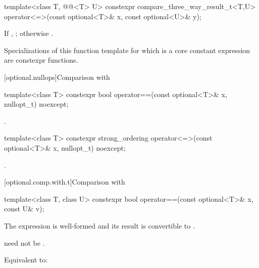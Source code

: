 %
\begin{itemdecl}
template<class T, @@<T> U>
  constexpr compare_three_way_result_t<T,U>
    operator<=>(const optional<T>& x, const optional<U>& y);
\end{itemdecl}

\begin{itemdescr}
\pnum
\returns
If , ; otherwise .

\pnum
\remarks
Specializations of this function template
for which  is a core constant expression
are constexpr functions.
\end{itemdescr}

[optional.nullops]{Comparison with }

%
\begin{itemdecl}
template<class T> constexpr bool operator==(const optional<T>& x, nullopt_t) noexcept;
\end{itemdecl}

\begin{itemdescr}
\pnum
\returns
{}.
\end{itemdescr}

%
\begin{itemdecl}
template<class T> constexpr strong_ordering operator<=>(const optional<T>& x, nullopt_t) noexcept;
\end{itemdecl}

\begin{itemdescr}
\pnum
\returns
{}.
\end{itemdescr}

[optional.comp.with.t]{Comparison with }

%
\begin{itemdecl}
template<class T, class U> constexpr bool operator==(const optional<T>& x, const U& v);
\end{itemdecl}

\begin{itemdescr}
\pnum
\mandates
The expression  is well-formed and
its result is convertible to .
\begin{note}
 need not be .
\end{note}

\pnum
\effects
Equivalent to: 
\end{itemdescr}

